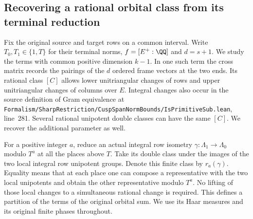 \documentclass[a4paper,11pt]{article}
\theoremstyle{definition}
\theoremstyle{remark}
\newcommand{\srcloc}[2]{{\small\nolinkurl{#1.lean}}, line~#2}
\numberwithin{equation}{section}
\begin{document}
\subsection{Recovering a rational orbital class from its terminal reduction}
\label{sec:terminalorbits640}

Fix the original source and target rows on a common interval. Write
\(T_0,T_1\in\{1,T\}\) for their terminal norms, \(f=[E^+:\QQ]\)
and \(d=s+1\). We study the terms with common positive dimension
\(k-1\). In one such term the cross matrix records the pairings of
the \(d\) ordered frame vectors at the two ends. Its rational
class \([C]\) allows lower unitriangular changes of rows and upper
unitriangular changes of columns over \(E\). Integral changes
also occur in the source definition of Gram equivalence at
\srcloc{Formalism/SharpRestriction/CuspSpanNormBounds/IsPrimitiveSub}{281}.
Several rational unipotent double classes can have the same
\([C]\). We recover the additional parameter as well.

For a positive integer \(a\), reduce an actual integral row
isometry \(\gamma:\Lambda_1\to\Lambda_0\) modulo \(T^a\) at
all the places above \(T\). Take its double class under the
images of the two local integral row unipotent groups. Denote
this finite class by \(r_a(\gamma)\). Equality means that at
each place one can compose a representative with the two local
unipotents and obtain the other representative modulo \(T^a\).
No lifting of those local changes to a simultaneous rational
change is required. This defines a partition of the terms of
the original orbital sum. We use its Haar measures and its
original finite phases throughout.
\end{document}
